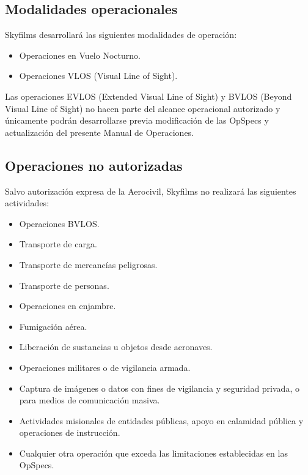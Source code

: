 \subsection{Modalidades operacionales}

Skyfilms desarrollará las siguientes modalidades de operación:

\begin{itemize}

\item Operaciones en Vuelo Nocturno.

\item Operaciones VLOS (Visual Line of Sight).


\end{itemize}

Las operaciones EVLOS (Extended Visual Line of Sight) y BVLOS (Beyond Visual Line of Sight) no hacen parte del alcance operacional autorizado y únicamente podrán desarrollarse previa modificación de las OpSpecs y actualización del presente Manual de Operaciones.



\subsection{Operaciones no autorizadas}

Salvo autorización expresa de la Aerocivil, Skyfilms no realizará las siguientes actividades:

\begin{itemize}

\item Operaciones BVLOS.

\item Transporte de carga.

\item Transporte de mercancías peligrosas.

\item Transporte de personas.

\item Operaciones en enjambre.

\item Fumigación aérea.

\item Liberación de sustancias u objetos desde aeronaves.

\item Operaciones militares o de vigilancia armada.

\item Captura de imágenes o datos con fines de vigilancia y seguridad privada, o para medios de comunicación masiva.

\item Actividades misionales de entidades públicas, apoyo en calamidad pública y operaciones de instrucción.

\item Cualquier otra operación que exceda las limitaciones establecidas en las OpSpecs.

\end{itemize}



